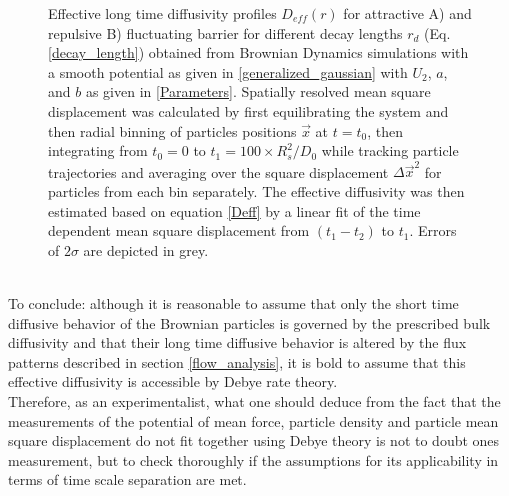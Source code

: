 \begin{minipage}[t]{.37 \textwidth}
    \begin{figure}[H]
    \caption{Effective long time diffusivity profiles $D_{eff}(r)$ for attractive A) and repulsive B) fluctuating barrier for different decay lengths $r_d$ (Eq. \eqref{decay_length}) obtained from Brownian Dynamics simulations with a smooth potential as given in \eqref{generalized_gaussian} with $U_2$, $a$, and $b$ as given in \eqref{Parameters}. Spatially resolved mean square displacement was calculated by first equilibrating the system and then radial binning of particles positions $\vec{x}$ at $t = t_0$, then integrating from $t_0 = 0$ to $t_1 = 100 \times R_s^2/D_0$ while tracking particle trajectories and averaging over the square displacement $\Delta \vec{x}^{2}$ for particles from each bin separately. The effective diffusivity was then estimated based on equation \eqref{Deff} by a linear fit of the time dependent mean square displacement from $(t_1-t_2)$ to $t_1$. Errors of $2 \sigma$ are depicted in grey.\label{DeffBDLong}}
    \end{figure}
  \end{minipage}
\vspace{0.3 cm}\\
To conclude: although it is reasonable to assume that only the short time diffusive behavior of the Brownian particles is governed by the prescribed bulk diffusivity and that their long time diffusive behavior is altered by the flux patterns described in section \ref{flow_analysis}, it is bold to assume that this effective diffusivity is accessible by Debye rate theory.\\
Therefore, as an experimentalist, what one should deduce from the fact that the measurements of the potential of mean force, particle density and particle mean square displacement do not fit together using Debye theory is not to doubt ones measurement, but to check thoroughly if the assumptions for its applicability in terms of time scale separation are met.
